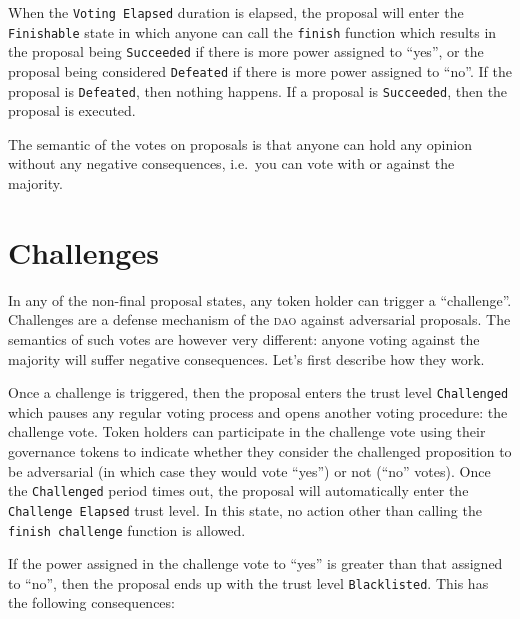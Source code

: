 When the \texttt{Voting Elapsed} duration is elapsed, the proposal will enter the \texttt{Finishable} state in which anyone can call the \texttt{finish} function which results in the proposal being \texttt{Succeeded} if there is more power assigned to \enquote{yes}, or the proposal being considered \texttt{Defeated} if there is more power assigned to \enquote{no}.
If the proposal is \texttt{Defeated}, then nothing happens.
If a proposal is \texttt{Succeeded}, then the proposal is executed.

The semantic of the votes on proposals is that anyone can hold any opinion without any negative consequences, i.e.\ you can vote with or against the majority.

\section{Challenges}

In any of the non-final proposal states, any token holder can trigger a \enquote{challenge}.
Challenges are a defense mechanism of the \textsc{dao} against adversarial proposals.
The semantics of such votes are however very different: anyone voting against the majority will suffer negative consequences.
Let's first describe how they work.

Once a challenge is triggered, then the proposal enters the trust level \texttt{Challenged} which pauses any regular voting process and opens another voting procedure: the challenge vote.
Token holders can participate in the challenge vote using their governance tokens to indicate whether they consider the challenged proposition to be adversarial (in which case they would vote \enquote{yes}) or not (\enquote{no} votes).
Once the \texttt{Challenged} period times out, the proposal will automatically enter the \texttt{Challenge Elapsed} trust level.
In this state, no action other than calling the \texttt{finish challenge} function is allowed.

If the power assigned in the challenge vote to \enquote{yes} is greater than that assigned to \enquote{no}, then the proposal ends up with the trust level \texttt{Blacklisted}.
This has the following consequences:

